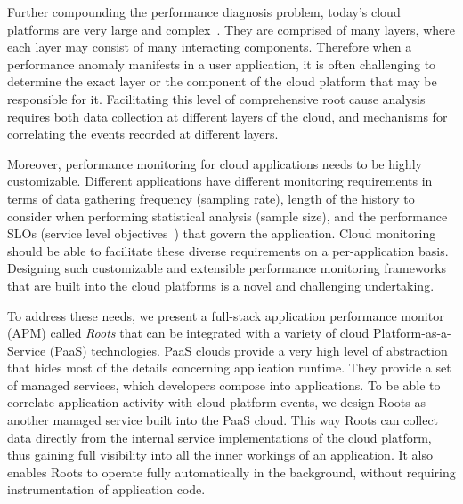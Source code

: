 %

Further compounding the performance
diagnosis problem, today's cloud platforms are very 
large and complex~\cite{DaCunhaRodrigues:2016:MCC:2851613.2851619,Ibidunmoye:2015:PAD:2808687.2791120}. 
They are
comprised of many layers, where each layer may consist of many interacting components.
Therefore when a performance anomaly manifests in a user application, it is
often challenging
to determine the exact layer or the component of the cloud platform that may be responsible for it. 
Facilitating this level of comprehensive root cause analysis requires
both data collection at different layers of the cloud, and mechanisms for correlating 
the events recorded at different layers. 
%
%

Moreover, performance monitoring for cloud applications needs to be highly customizable. Different
applications have different monitoring requirements in terms of data gathering frequency (sampling rate), 
length of the history to consider when performing statistical analysis (sample size), and the performance 
SLOs (service level objectives~\cite{Keller:2003:WFS:635430.635442}) that govern the application.
Cloud monitoring should be able to facilitate these diverse requirements on a
per-application basis.
Designing such customizable and extensible performance
monitoring frameworks that are built into the cloud platforms is a novel and challenging undertaking.

To address these needs, we present a full-stack application performance
monitor (APM) called \textit{Roots} that can be integrated
with a variety of cloud Platform-as-a-Service (PaaS) technologies. 
PaaS clouds provide a very high level of abstraction that hides most of the details concerning application
runtime. They provide a set of managed services, which developers compose into applications.
To be able to correlate application activity with cloud platform events,
we design Roots as another managed service built into the PaaS cloud. 
This way Roots can collect data
directly from the internal service implementations of the cloud platform, thus gaining full visibility into all the 
inner workings of an application. It also enables Roots to operate fully automatically in the background, without
requiring instrumentation of application code. 

